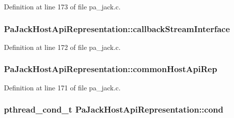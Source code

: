 Definition at line 173 of file pa\+\_\+jack.\+c.

\subsubsection[{\texorpdfstring{callback\+Stream\+Interface}{callbackStreamInterface}}]{ Pa\+Jack\+Host\+Api\+Representation\+::callback\+Stream\+Interface}\hypertarget{struct_pa_jack_host_api_representation_a1a68d0e2089e255ebdb7fb001d9d3b60}{}\label{struct_pa_jack_host_api_representation_a1a68d0e2089e255ebdb7fb001d9d3b60}


Definition at line 172 of file pa\+\_\+jack.\+c.

\subsubsection[{\texorpdfstring{common\+Host\+Api\+Rep}{commonHostApiRep}}]{ Pa\+Jack\+Host\+Api\+Representation\+::common\+Host\+Api\+Rep}\hypertarget{struct_pa_jack_host_api_representation_ae48a62bf0169aab8612d7435f10cf9d7}{}\label{struct_pa_jack_host_api_representation_ae48a62bf0169aab8612d7435f10cf9d7}


Definition at line 171 of file pa\+\_\+jack.\+c.

\subsubsection[{\texorpdfstring{cond}{cond}}]{\setlength{\rightskip}{0pt plus 5cm}pthread\+\_\+cond\+\_\+t Pa\+Jack\+Host\+Api\+Representation\+::cond}\hypertarget{struct_pa_jack_host_api_representation_a14fb0a838735f2302de25324fd7754a3}{}\label{struct_pa_jack_host_api_representation_a14fb0a838735f2302de25324fd7754a3}


